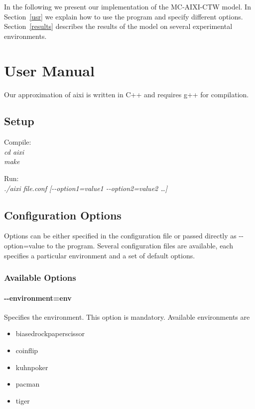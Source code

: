 \documentclass[paper=a4, fontsize=11pt]{scrartcl} %
\numberwithin{equation}{section} %
\numberwithin{figure}{section} %
\numberwithin{table}{section} %
\begin{document}
\bigskip

In the following we present our implementation of the MC-AIXI-CTW model. In Section~\ref{usr} we explain how to use the program and specify different options. Section~\ref{results} describes the results of the model on several experimental environments.


\section{\label{usr}User Manual}

Our approximation of aixi is written in C++ and requires g++ for compilation.

\subsection{Setup}

\setlength\parindent{20pt}
\noindent Compile:\\
\indent \textit{cd aixi}\\
\indent \textit{make}

\bigskip

\noindent Run:\\
\indent \textit{./aixi file.conf [-{}-option1=value1 -{}-option2=value2 \dots]}
\setlength\parindent{0pt}


\subsection{Configuration Options}

Options can be either specified in the configuration file or passed directly as -{}-option=value to the program. Several configuration files are available, each specifies a particular environment and a set of default options. 

\subsubsection*{Available Options}

\paragraph{-{}-environment=env} Specifies the environment. This option is mandatory. Available environments are
\begin{itemize}
\itemsep0pt
\renewcommand\labelitemi{--}
    \item biased\textunderscore rock\textunderscore paper\textunderscore scissor
    \item coinflip
    \item kuhn\textunderscore poker
    \item pacman
    \item tiger
\end{itemize}
\end{document}
